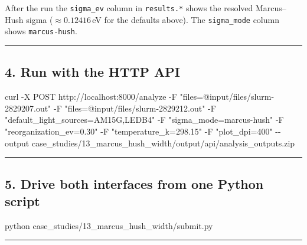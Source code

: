 \documentclass[
  11pt,
]{article}
\newenvironment{Shaded}{}{}
\newcommand{\AttributeTok}[1]{\textcolor[rgb]{0.49,0.56,0.16}{#1}}
\newcommand{\ExtensionTok}[1]{#1}
\newcommand{\NormalTok}[1]{#1}
\newcommand{\StringTok}[1]{\textcolor[rgb]{0.25,0.44,0.63}{#1}}
\begin{document}
After the run the \texttt{sigma\_ev} column in \texttt{results.*} shows
the resolved Marcus--Hush sigma (\(\approx 0.12416\)\,eV for the
defaults above). The \texttt{sigma\_mode} column shows
\texttt{marcus-hush}.

\begin{center}\rule{0.5\linewidth}{0.5pt}\end{center}

\hypertarget{4-run-with-the-http-api}{
\subsection{4. Run with the HTTP API}\label{4-run-with-the-http-api}}

\begin{Shaded}
\begin{Highlighting}[]
\ExtensionTok{curl} \AttributeTok{{-}X}\NormalTok{ POST http://localhost:8000/analyze }\AttributeTok{{-}F} \StringTok{"files=@input/files/slurm-2829207.out"} \AttributeTok{{-}F} \StringTok{"files=@input/files/slurm-2829212.out"} \AttributeTok{{-}F} \StringTok{"default\_light\_sources=AM15G,LEDB4"} \AttributeTok{{-}F} \StringTok{"sigma\_mode=marcus-hush"} \AttributeTok{{-}F} \StringTok{"reorganization\_ev=0.30"} \AttributeTok{{-}F} \StringTok{"temperature\_k=298.15"} \AttributeTok{{-}F} \StringTok{"plot\_dpi=400"} \AttributeTok{{-}{-}output}\NormalTok{ case\_studies/13\_marcus\_hush\_width/output/api/analysis\_outputs.zip}
\end{Highlighting}
\end{Shaded}

\begin{center}\rule{0.5\linewidth}{0.5pt}\end{center}

\hypertarget{5-drive-both-interfaces-from-one-python-script}{
\subsection{5. Drive both interfaces from one Python
script}\label{5-drive-both-interfaces-from-one-python-script}}

\begin{Shaded}
\begin{Highlighting}[]
\ExtensionTok{python}\NormalTok{ case\_studies/13\_marcus\_hush\_width/submit.py}
\end{Highlighting}
\end{Shaded}

\begin{center}\rule{0.5\linewidth}{0.5pt}\end{center}
\end{document}
